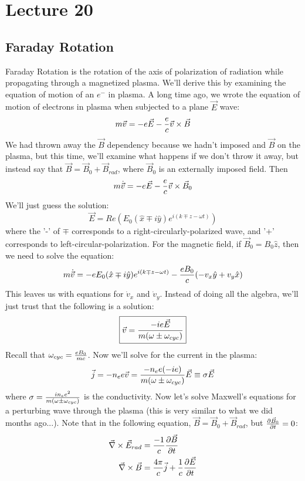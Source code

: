 \documentclass[11pt]{article}
\def\.{\dot}
\def\^{\hat}
\def\inv#1{{1 \over #1}}
\def\ef{\vec E}
\def\bfield{{\vec B}}
\begin{document}
\section*{ Lecture 20 }

\subsection*{ Faraday Rotation}

Faraday Rotation is the rotation of the axis of polarization of radiation
while propagating through a magnetized plasma.  We'll derive this by examining
the equation of motion of an $e^-$ in plasma.  A long time ago, we wrote the
equation of motion of electrons in plasma when subjected to a plane $\ef$ wave:
\def\vv{{\vec v}}
$$m\vv=-e\ef-{e\over c}\vv\times\bfield$$
We had thrown away the $\bfield$ dependency because we hadn't imposed 
and $\bfield$ on the plasma, but this time, we'll examine what happens if we
don't throw it away, but instead say that $\bfield=\bfield_0+\bfield_{rad}$,
where $\bfield_0$ is an externally imposed field.  Then
$$m\.\vv=-e\ef-{e\over c}\vv\times\bfield_0$$
We'll just guess the solution:
$$\ef=Re\left(E_0(\^x\mp i\^y)e^{i(k\mp z-\omega t)}\right)$$
where the '-' of $\mp$ corresponds to a right-circularly-polarized wave, and
'+' corresponds to left-circular-polarization.  For the magnetic field, if
$\bfield_0=B_0\^z$, then we need to solve the equation:
$$m\.\vv=-eE_0(\^x\mp i\^y)e^{i(k\mp z-\omega t)}
-{eB_0\over c}(-v_x\^y+v_y\^x)$$
This leaves us with equations for $\.v_x$ and $\.v_y$.  Instead of doing all
the algebra, we'll just trust that the following is a solution:
$$\boxed{\vv={-ie\ef\over m(\omega\pm\omega_{cyc})}}$$
Recall that $\omega_{cyc}={eB_0\over mc}$.  Now we'll solve for the current
in the plasma:
\def\ocyc{\omega_{cyc}}
$$\vec j=-n_ee\vv={-n_ee(-ie)\over m(\omega\pm\ocyc)}\ef\equiv\sigma\ef$$
where $\sigma={in_ee^2\over m(\omega\pm\ocyc)}$ is the conductivity.  Now let's
solve Maxwell's equations for a perturbing wave through the plasma 
(this is very similar to what we did months ago...).  Note that in the following
equation, $\bfield=\bfield_0+\bfield_{rad}$, but $\ppt{\bfield_0}=0$:
\def\erad{{\ef_{rad}}}
\def\brad{{\bfield_{rad}}}
\def\jv{{\vec j}}
\def\div{{\vec\nabla}}
$$\begin{aligned}\div\times\erad&={-1\over c}\ppt{\bfield}\\ 
\div\times\bfield&={4\pi\over c}\jv+\inv{c}\ppt{\ef}\\ \end{aligned}$$
\end{document}
